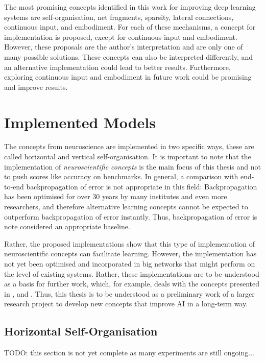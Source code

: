 The most promising concepts identified in this work for improving deep learning systems are self-organisation, net fragments, sparsity, lateral connections, continuous input, and embodiment. For each of these mechanisms, a concept for implementation is proposed, except for continuous input and embodiment. However, these proposals are the author's interpretation and are only one of many possible solutions. These concepts can also be interpreted differently, and an alternative implementation could lead to better results. Furthermore, exploring continuous input and embodiment in future work could be promising and improve results. 


\section{Implemented Models}
The concepts from neuroscience are implemented in two specific ways, these are called horizontal and vertical self-organisation. It is important to note that the implementation of \emph{neuroscientific concepts} is the main focus of this thesis and not to push scores like accuracy on benchmarks. In general, a comparison with end-to-end backpropagation of error is not appropriate in this field: Backpropagation has been optimised for over 30 years by many institutes and even more researchers, and therefore alternative learning concepts cannot be expected to outperform backpropagation of error instantly. Thus, backpropagation of error is note considered an appropriate baseline.

Rather, the proposed implementations show that this type of implementation of neuroscientific concepts can facilitate learning. However, the implementation has not yet been optimised and incorporated in big networks that might perform on the level of existing systems. Rather, these implementations are to be understood as a basis for further work, which, for example, deals with the concepts presented in ,  and . Thus, this thesis is to be understood as a preliminary work of a larger research project to develop new concepts that improve AI in a long-term way.


\subsection{Horizontal Self-Organisation}
TODO: this section is not yet complete as many experiments are still ongoing...


